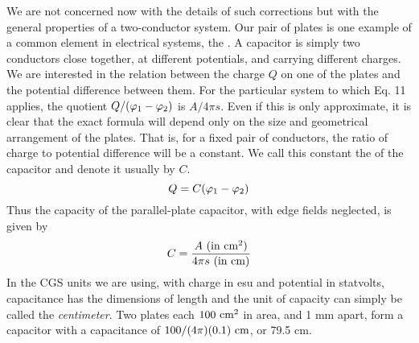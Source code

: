 We are not concerned now with the details of such corrections but
with the general properties of a two-conductor system. Our pair of
plates is one example of a common element in electrical systems, the
. A capacitor is simply two conductors close together, at
different potentials, and carrying different charges. We are interested
in the relation between the charge $Q$ on one of the plates and
the potential difference between them. For the particular system
to which Eq. 11 applies, the quotient $Q/(\varphi_1-\varphi_2)$ is $A/4\pi s$. Even
if this is only approximate, it is clear that the exact formula will depend
only on the size and geometrical arrangement of the plates.
That is, for a fixed pair of conductors, the ratio of charge to potential
difference will be a constant. We call this constant the 
of the capacitor and denote it usually by $C$.
\begin{equation}
  Q = C(\varphi_1-\varphi_2)
\end{equation}
Thus the capacity of the parallel-plate capacitor, with edge fields
neglected, is given by
\begin{equation}
  C = \frac{\text{$A$ (in $\textup{cm}^2$)}}{\text{$4\pi s$ (in cm)}}
\end{equation}
In the CGS units we are using, with charge in esu and potential in
statvolts, capacitance has the dimensions of length and the unit of
capacity can simply be called the \emph{centimeter}. Two plates each
$100\ \cmunit^2$ in area, and 1 mm apart, form a capacitor with a capacitance
of $100/(4\pi)(0.1)\ \cmunit$, or 79.5 cm.

